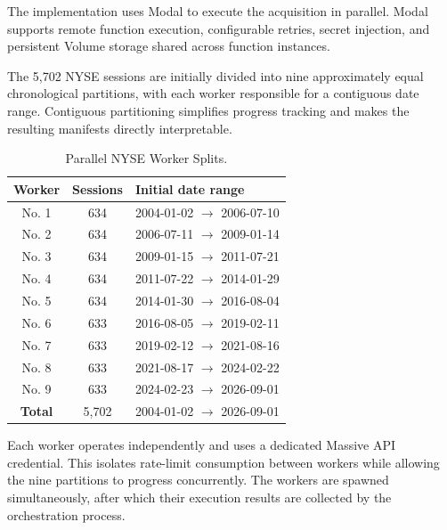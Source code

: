 The implementation uses Modal to execute the acquisition in parallel. Modal supports remote function execution, configurable retries, secret injection, and persistent Volume storage shared across function instances.

\medskip

The 5,702 \acs{NYSE} sessions are initially divided into nine approximately equal chronological partitions, with each worker responsible for a contiguous date range. Contiguous partitioning simplifies progress tracking and makes the resulting manifests directly interpretable.

\begin{table}[H]
    \centering
    \small
    \begin{tabular}{ccl}
        \toprule
        \textbf{Worker} & \textbf{Sessions} & \textbf{Initial date range}         \\
        \midrule
        No. 1           & 634               & 2004-01-02 $\rightarrow$ 2006-07-10 \\
        No. 2           & 634               & 2006-07-11 $\rightarrow$ 2009-01-14 \\
        No. 3           & 634               & 2009-01-15 $\rightarrow$ 2011-07-21 \\
        No. 4           & 634               & 2011-07-22 $\rightarrow$ 2014-01-29 \\
        No. 5           & 634               & 2014-01-30 $\rightarrow$ 2016-08-04 \\
        No. 6           & 633               & 2016-08-05 $\rightarrow$ 2019-02-11 \\
        No. 7           & 633               & 2019-02-12 $\rightarrow$ 2021-08-16 \\
        No. 8           & 633               & 2021-08-17 $\rightarrow$ 2024-02-22 \\
        No. 9           & 633               & 2024-02-23 $\rightarrow$ 2026-09-01 \\
        \midrule
        \textbf{Total}  & 5,702             & 2004-01-02 $\rightarrow$ 2026-09-01 \\
        \bottomrule
    \end{tabular}
    \caption{Parallel \acs{NYSE} Worker Splits.}
    \label{tab:parallel-nyse-worker-splits}
\end{table}

Each worker operates independently and uses a dedicated Massive \acs{API} credential. This isolates rate-limit consumption between workers while allowing the nine partitions to progress concurrently. The workers are spawned simultaneously, after which their execution results are collected by the orchestration process.

